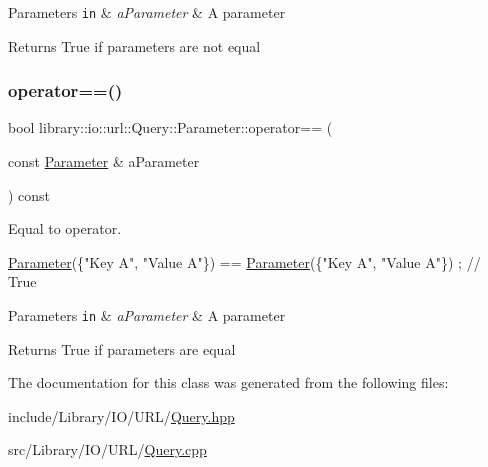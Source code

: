 \begin{DoxyParams}[1]{Parameters}
\mbox{\tt in}  & {\em a\+Parameter} & A parameter \\
\hline
\end{DoxyParams}
\begin{DoxyReturn}{Returns}
True if parameters are not equal 
\end{DoxyReturn}
\mbox{\label{classlibrary_1_1io_1_1url_1_1_query_1_1_parameter_ac00203e201de2c2e510ae59e01a9a12c}} 
\subsubsection{\texorpdfstring{operator==()}{operator==()}}
{\footnotesize\ttfamily bool library\+::io\+::url\+::\+Query\+::\+Parameter\+::operator== (\begin{DoxyParamCaption}\item[{const \hyperlink{classlibrary_1_1io_1_1url_1_1_query_1_1_parameter}{Parameter} \&}]{a\+Parameter }\end{DoxyParamCaption}) const}



Equal to operator. 


\begin{DoxyCode}
\hyperlink{classlibrary_1_1io_1_1url_1_1_query_1_1_parameter_ad6160646a07cb92213403426dbba4c64}{Parameter}(\{\textcolor{stringliteral}{"Key A"}, \textcolor{stringliteral}{"Value A"}\}) == \hyperlink{classlibrary_1_1io_1_1url_1_1_query_1_1_parameter_ad6160646a07cb92213403426dbba4c64}{Parameter}(\{\textcolor{stringliteral}{"Key A"}, \textcolor{stringliteral}{"Value A"}\}) ; \textcolor{comment}{// True}
\end{DoxyCode}



\begin{DoxyParams}[1]{Parameters}
\mbox{\tt in}  & {\em a\+Parameter} & A parameter \\
\hline
\end{DoxyParams}
\begin{DoxyReturn}{Returns}
True if parameters are equal 
\end{DoxyReturn}


The documentation for this class was generated from the following files\+:\begin{DoxyCompactItemize}
\item 
include/\+Library/\+I\+O/\+U\+R\+L/\hyperlink{_query_8hpp}{Query.\+hpp}\item 
src/\+Library/\+I\+O/\+U\+R\+L/\hyperlink{_query_8cpp}{Query.\+cpp}\end{DoxyCompactItemize}
